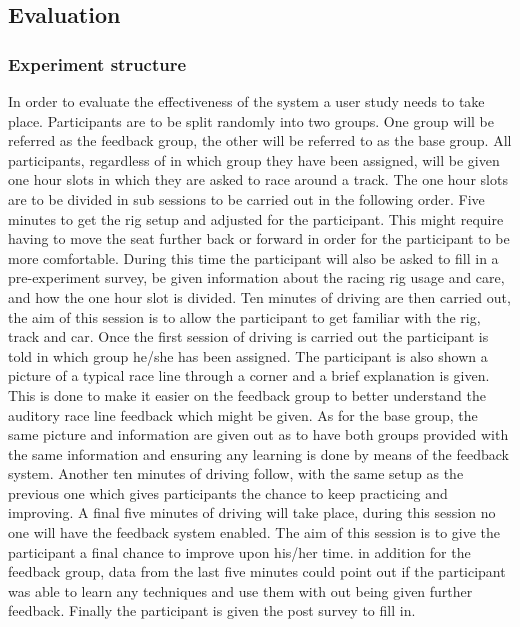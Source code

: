 \subsection{Evaluation}

\subsubsection{Experiment structure}
	In order to evaluate the effectiveness of the system a user study needs to take place. Participants are to be split randomly into two groups. One group will be referred as the feedback group, the other will be referred to as the base group. All participants, regardless of in which group they have been assigned, will be given one hour slots in which they are asked to race around a track. The one hour slots are to be divided in sub sessions to be carried out in the following order. Five minutes to get the rig setup and adjusted for the participant. This might require having to move the seat further back or forward in order for the participant to be more comfortable. During this time the participant will also be asked to fill in a pre-experiment survey, be given information about the racing rig usage and care, and how the one hour slot is divided. Ten minutes of driving are then carried out, the aim of this session is to allow the participant to get familiar with the rig, track and car. Once the first session of driving is carried out the participant is told in which group he/she has been assigned. The participant is also shown a picture of a typical race line through a corner and a brief explanation is given. This is done to make it easier on the feedback group to better understand the auditory race line feedback which might be given. As for the base group, the same picture and information are given out as to have both groups provided with the same information and ensuring any learning is done by means of the feedback system. Another ten minutes of driving follow, with the same setup as the previous one which gives participants the chance to keep practicing and improving. A final five minutes of driving will take place, during this session no one will have the feedback system enabled. The aim of this session is to give the participant a final chance to improve upon his/her time. in addition for the feedback group, data from the last five minutes could point out if the participant was able to learn any techniques and use them with out being given further feedback. Finally the participant is given the post survey to fill in.

